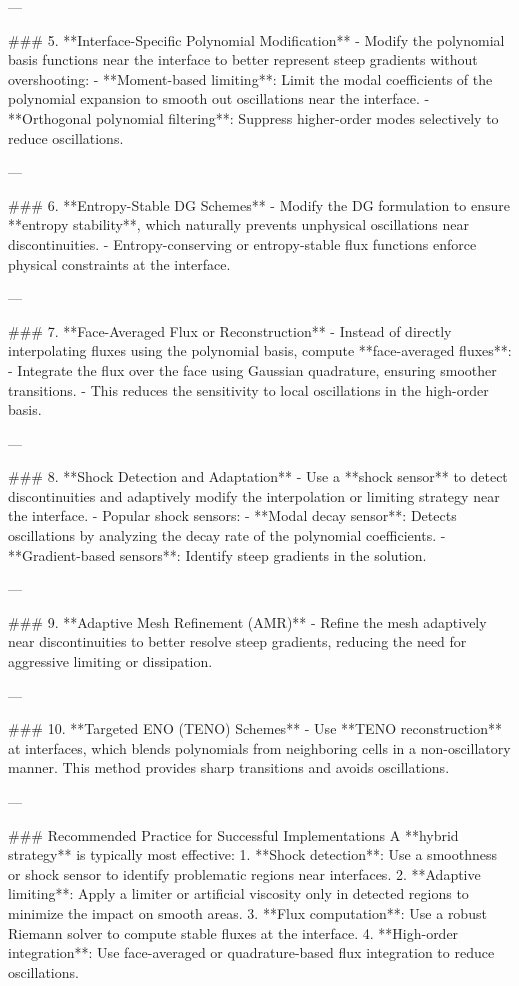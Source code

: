 ---

### 5. **Interface-Specific Polynomial Modification**
   - Modify the polynomial basis functions near the interface to better represent steep gradients without overshooting:
     - **Moment-based limiting**: Limit the modal coefficients of the polynomial expansion to smooth out oscillations near the interface.
     - **Orthogonal polynomial filtering**: Suppress higher-order modes selectively to reduce oscillations.

---

### 6. **Entropy-Stable DG Schemes**
   - Modify the DG formulation to ensure **entropy stability**, which naturally prevents unphysical oscillations near discontinuities.
   - Entropy-conserving or entropy-stable flux functions enforce physical constraints at the interface.

---

### 7. **Face-Averaged Flux or Reconstruction**
   - Instead of directly interpolating fluxes using the polynomial basis, compute **face-averaged fluxes**:
     - Integrate the flux over the face using Gaussian quadrature, ensuring smoother transitions.
     - This reduces the sensitivity to local oscillations in the high-order basis.

---

### 8. **Shock Detection and Adaptation**
   - Use a **shock sensor** to detect discontinuities and adaptively modify the interpolation or limiting strategy near the interface.
   - Popular shock sensors:
     - **Modal decay sensor**: Detects oscillations by analyzing the decay rate of the polynomial coefficients.
     - **Gradient-based sensors**: Identify steep gradients in the solution.

---

### 9. **Adaptive Mesh Refinement (AMR)**
   - Refine the mesh adaptively near discontinuities to better resolve steep gradients, reducing the need for aggressive limiting or dissipation.

---

### 10. **Targeted ENO (TENO) Schemes**
   - Use **TENO reconstruction** at interfaces, which blends polynomials from neighboring cells in a non-oscillatory manner. This method provides sharp transitions and avoids oscillations.

---

### Recommended Practice for Successful Implementations
A **hybrid strategy** is typically most effective:
1. **Shock detection**: Use a smoothness or shock sensor to identify problematic regions near interfaces.
2. **Adaptive limiting**: Apply a limiter or artificial viscosity only in detected regions to minimize the impact on smooth areas.
3. **Flux computation**: Use a robust Riemann solver to compute stable fluxes at the interface.
4. **High-order integration**: Use face-averaged or quadrature-based flux integration to reduce oscillations.

